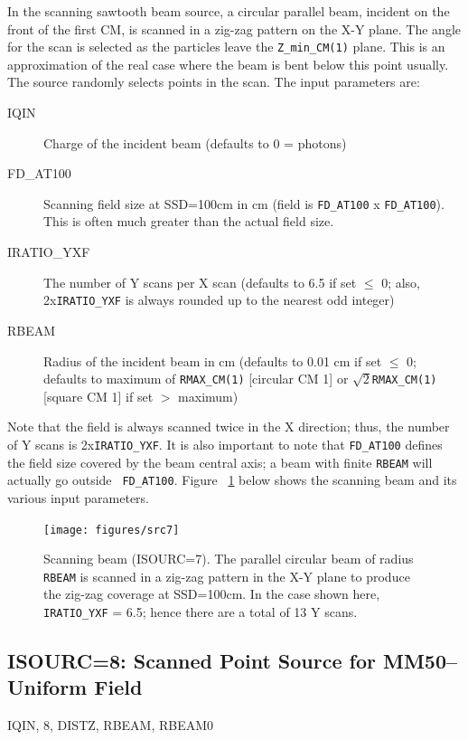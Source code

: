 \documentclass[12pt,twoside]{article}
\newcommand{\cen}[1]{\begin{center} #1 \end{center}                   }
\begin{document}
In the scanning sawtooth beam source, a circular parallel beam, incident on the
front of the first CM,
is scanned in a zig-zag pattern on the X-Y plane.   The angle for the
scan is selected as the particles leave the \verb+Z_min_CM(1)+ plane.
This is an approximation of the real case where the beam is bent below
this point usually.  The source randomly selects points in the scan.
The input parameters are:
\begin{description}
\item [IQIN] Charge of the incident beam (defaults to 0 = photons)
\item [FD\_AT100] Scanning field size at SSD=100cm in cm (field is
{\tt FD\_AT100} x {\tt FD\_AT100}). This is often much greater than the actual field
size.
\item [IRATIO\_YXF] The number of Y scans per X scan (defaults to 6.5 if
set $\leq$ 0; also, 2x{\tt IRATIO\_YXF} is always rounded up to the nearest odd
integer)
\item [RBEAM] Radius of the incident beam in cm (defaults to 0.01 cm if
set $\leq$ 0; defaults to maximum of \verb+RMAX_CM(1)+ [circular CM 1] or
$\sqrt{2}$\verb+RMAX_CM(1)+ [square CM 1] if set $>$ maximum)
\end{description}
Note that the field is always scanned twice in the X direction; thus,
the number of Y scans is 2x{\tt IRATIO\_YXF}.  It is also important to note
that {\tt FD\_AT100} defines the field size covered by the beam central axis;
a beam with finite \verb+RBEAM+ will actually go outside {\tt
FD\_AT100}.
Figure ~\ref{fig_src7} below shows the scanning beam and its various
input parameters.
\begin{figure}[htbp]
\leavevmode
\begin{center}
\mbox{}\hspace{0cm}
\texttt{[image: figures/src7]}
\caption[ISOURC=7: Scanning sawtooth beam]
{Scanning beam (ISOURC=7).  The parallel circular beam of radius
{\tt RBEAM}
is scanned in a zig-zag pattern in the X-Y plane to produce the zig-zag
coverage at SSD=100cm.  In the case shown here, {\tt IRATIO\_YXF} = 6.5; hence
there are a total of 13 Y scans.}
\label{fig_src7}
\end{center}
\end{figure}

\clearpage
\subsection[ISOURC=8: Scanned Point Source for MM50--Uniform]{ISOURC=8: Scanned Point Source for MM50--Uniform Field}
\cen{IQIN, 8, DISTZ, RBEAM, RBEAM0}
\end{document}
